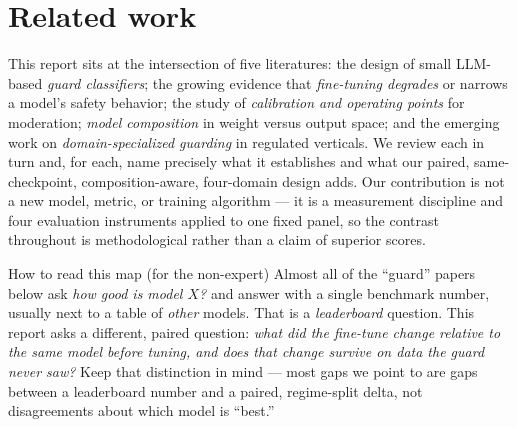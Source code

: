 \section{Related work}
\label{sec:related}

This report sits at the intersection of five literatures: the design of small LLM-based
\emph{guard classifiers}; the growing evidence that \emph{fine-tuning degrades} or narrows a
model's safety behavior; the study of \emph{calibration and operating points} for moderation;
\emph{model composition} in weight versus output space; and the emerging work
on \emph{domain-specialized guarding} in regulated verticals. We review each in turn and, for each,
name precisely what it establishes and what our paired, same-checkpoint,
composition-aware, four-domain design adds. Our contribution is not a new model, metric, or training
algorithm --- it is a measurement discipline and four evaluation instruments applied to one fixed
panel, so the contrast throughout is methodological rather than a claim of superior scores.

\begin{background}{How to read this map (for the non-expert)}
Almost all of the ``guard'' papers below ask \emph{how good is model $X$?} and answer with a single
benchmark number, usually next to a table of \emph{other} models. That is a \emph{leaderboard}
question. This report asks a different, paired question: \emph{what did the fine-tune change relative
to the same model before tuning, and does that change survive on data the guard never saw?} Keep that
distinction in mind --- most gaps we point to are gaps between a leaderboard number and a paired,
regime-split delta, not disagreements about which model is ``best.''
\end{background}

